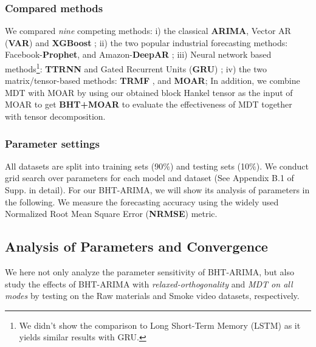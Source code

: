 \documentclass[letterpaper]{article} %
\numberwithin{theorem}{section}
\begin{document}
\subsubsection{Compared methods}  
We  compared \textit{nine} competing methods:  i) the   classical 
\textbf{ARIMA}, Vector AR (\textbf{VAR})  and \textbf{XGBoost}  \cite{chen2016xgboost}; ii) the two popular industrial forecasting methods: Facebook-\textbf{Prophet},  and Amazon-\textbf{DeepAR} \cite{salinas2017deepar}; iii) Neural network based methods\footnote{We didn't show the  comparison to Long Short-Term Memory (LSTM) as it yields similar results with GRU.}:  \textbf{TTRNN} \cite{yu2017long} and  Gated Recurrent Units (\textbf{GRU}) \cite{cho2014learning};   iv)  the two matrix/tensor-based  methods:  
\textbf{TRMF} \cite{yu2016temporal},   
 and 
\textbf{MOAR};   In addition, we combine MDT with MOAR by using  our obtained block Hankel tensor as the input of   MOAR   to get 
\textbf{BHT+MOAR} to evaluate the effectiveness of MDT together with tensor decomposition.

\subsubsection{Parameter settings}
All datasets are split into training sets (90$\%$) and testing sets (10$\%$).   We conduct grid search over parameters for each model and dataset (See Appendix B.1 of Supp. in detail). For our BHT-ARIMA, we will show its analysis of parameters in the following.  
We measure the forecasting accuracy  using the widely used Normalized Root Mean Square Error (\textbf{NRMSE})    metric.

\subsection {Analysis of  Parameters  and	Convergence }
We here not only  analyze the parameter sensitivity of   BHT-ARIMA,  but also    study the effects of   BHT-ARIMA  with  \textit{relaxed-orthogonality} and \textit{MDT on all  modes} by testing on the {Raw materials} and Smoke video datasets, respectively. 
\end{document}
